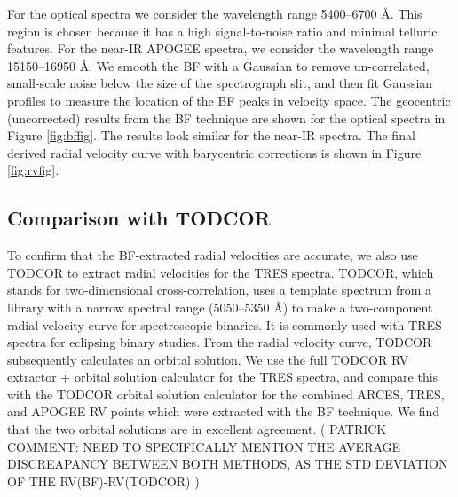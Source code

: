 For the optical spectra we consider the wavelength range 5400--6700 \AA. This region is chosen because it has a high signal-to-noise ratio and minimal telluric features. For the near-IR APOGEE spectra, we consider the wavelength range 15150--16950 \AA. We smooth the BF with a Gaussian to remove un-correlated, small-scale noise below the size of the spectrograph slit, and then fit Gaussian profiles to measure the location of the BF peaks in velocity space. The geocentric (uncorrected) results from the BF technique are shown for the optical spectra in Figure \ref{fig:bffig}. The results look similar for the near-IR spectra. The final derived radial velocity curve with barycentric corrections is shown in Figure \ref{fig:rvfig}.

\subsection{Comparison with TODCOR}\label{todcor}
To confirm that the BF-extracted radial velocities are accurate, we also use TODCOR \citep{zuc94} to extract radial velocities for the TRES spectra. TODCOR, which stands for two-dimensional cross-correlation, uses a template spectrum from a library with a narrow spectral range (5050--5350 \AA) to make a two-component radial velocity curve for spectroscopic binaries. It is commonly used with TRES spectra for eclipsing binary studies. From the radial velocity curve, TODCOR subsequently calculates an orbital solution. We use the full TODCOR RV extractor + orbital solution calculator for the TRES spectra, and compare this with the TODCOR orbital solution calculator for the combined ARCES, TRES, and APOGEE RV points which were extracted with the BF technique. We find that the two orbital solutions are in excellent agreement. ( PATRICK COMMENT: NEED TO SPECIFICALLY MENTION THE AVERAGE DISCREAPANCY BETWEEN BOTH METHODS, AS THE STD DEVIATION OF THE RV(BF)-RV(TODCOR) ) 
